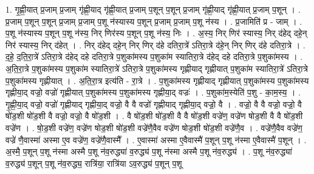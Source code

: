 \documentclass[17pt]{extarticle}
\begin{document}
1. गृ॒ह्णी॒यात् प्र॒जाम् प्र॒जाम् गृ॑ह्णी॒याद् गृ॑ह्णी॒यात् प्र॒जाम् प॒शून् प॒शून् प्र॒जाम् गृ॑ह्णी॒याद् गृ॑ह्णी॒यात् प्र॒जाम् प॒शून् । . प्र॒जाम् प॒शून् प॒शून् प्र॒जाम् प्र॒जाम् प॒शू न॑स्यास्य प॒शून् प्र॒जाम् प्र॒जाम् प॒शू न॑स्य । . प्र॒जामिति॑ प्र - जाम् । . प॒शू न॑स्यास्य प॒शून् प॒शू न॑स्य॒ निर् णिर॑स्य प॒शून् प॒शू न॑स्य॒ निः । . अ॒स्य॒ निर् णिर॑ स्यास्य॒ निर् द॑हेद् दहे॒न् निर॑ स्यास्य॒ निर् द॑हेत् । . निर् द॑हेद् दहे॒न् निर् णिर् द॑हे दतिरा॒त्रे॑ ऽतिरा॒त्रे द॑हे॒न् निर् णिर् द॑हे दतिरा॒त्रे । . द॒हे॒ द॒ति॒रा॒त्रे॑ ऽतिरा॒त्रे द॑हेद् दहे दतिरा॒त्रे प॒शुका॑मस्य प॒शुका॑म स्यातिरा॒त्रे द॑हेद् दहे दतिरा॒त्रे प॒शुका॑मस्य । . अ॒ति॒रा॒त्रे प॒शुका॑मस्य प॒शुका॑म स्यातिरा॒त्रे॑ ऽतिरा॒त्रे प॒शुका॑मस्य गृह्णीयाद् गृह्णीयात् प॒शुका॑म स्यातिरा॒त्रे॑ ऽतिरा॒त्रे प॒शुका॑मस्य गृह्णीयात् । . अ॒ति॒रा॒त्र इत्य॑ति - रा॒त्रे । . प॒शुका॑मस्य गृह्णीयाद् गृह्णीयात् प॒शुका॑मस्य प॒शुका॑मस्य गृह्णीया॒द् वज्रो॒ वज्रो॑ गृह्णीयात् प॒शुका॑मस्य प॒शुका॑मस्य गृह्णीया॒द् वज्रः॑ । . प॒शुका॑म॒स्येति॑ प॒शु - का॒म॒स्य॒ । . गृ॒ह्णी॒या॒द् वज्रो॒ वज्रो॑ गृह्णीयाद् गृह्णीया॒द् वज्रो॒ वै वै वज्रो॑ गृह्णीयाद् गृह्णीया॒द् वज्रो॒ वै । . वज्रो॒ वै वै वज्रो॒ वज्रो॒ वै षो॑ड॒शी षो॑ड॒शी वै वज्रो॒ वज्रो॒ वै षो॑ड॒शी । . वै षो॑ड॒शी षो॑ड॒शी वै वै षो॑ड॒शी वज्रे॑ण॒ वज्रे॑ण षोड॒शी वै वै षो॑ड॒शी वज्रे॑ण । . षो॒ड॒शी वज्रे॑ण॒ वज्रे॑ण षोड॒शी षो॑ड॒शी वज्रे॑णै॒वैव वज्रे॑ण षोड॒शी षो॑ड॒शी वज्रे॑णै॒व । . वज्रे॑णै॒वैव वज्रे॑ण॒ वज्रे॑ णै॒वास्मा॑ अस्मा ए॒व वज्रे॑ण॒ वज्रे॑णै॒वास्मै᳚ । . ए॒वास्मा॑ अस्मा ए॒वैवास्मै॑ प॒शून् प॒शू न॑स्मा ए॒वैवास्मै॑ प॒शून् । . अ॒स्मै॒ प॒शून् प॒शू न॑स्मा अस्मै प॒शू न॑व॒रुद्ध्या॑ व॒रुद्ध्य॑ प॒शू न॑स्मा अस्मै प॒शू न॑व॒रुद्ध्य॑ । . प॒शू न॑व॒रुद्ध्या॑ व॒रुद्ध्य॑ प॒शून् प॒शू न॑व॒रुद्ध्य॒ रात्रि॑या॒ रात्रि॑या ऽव॒रुद्ध्य॑ प॒शून् प॒शू
\end{document}
